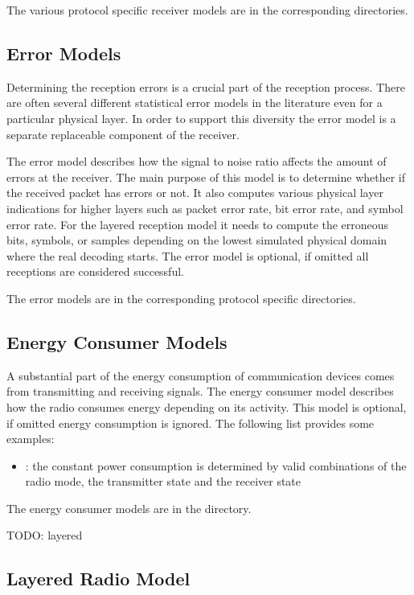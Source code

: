 The various protocol specific receiver models are in the corresponding 
directories.

\subsection{Error Models}

Determining the reception errors is a crucial part of the reception process.
There are often several different statistical error models in the literature
even for a particular physical layer. In order to support this diversity the
error model is a separate replaceable component of the receiver. 

The error model describes how the signal to noise ratio affects the amount of
errors at the receiver. The main purpose of this model is to determine whether
if the received packet has errors or not. It also computes various physical
layer indications for higher layers such as packet error rate, bit error rate,
and symbol error rate. For the layered reception model it needs to compute the
erroneous bits, symbols, or samples depending on the lowest simulated physical
domain where the real decoding starts. The error model is optional, if omitted
all receptions are considered successful.

The error models are in the corresponding protocol specific directories.

\subsection{Energy Consumer Models}

A substantial part of the energy consumption of communication devices comes from
transmitting and receiving signals. The energy consumer model describes how the
radio consumes energy depending on its activity. This model is optional, if
omitted energy consumption is ignored. The following list provides some examples:

\begin{itemize}
  \item {}: the constant power consumption is
determined by valid combinations of the radio mode, the transmitter state and
the receiver state
\end{itemize}

The energy consumer models are in the  directory.

\iffalse
TODO: layered
\subsection{Layered Radio Model}


